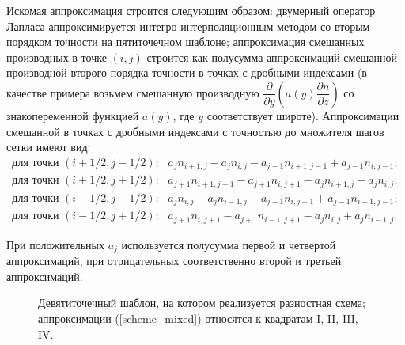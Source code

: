 \documentclass[14pt, a4paper]{extarticle}
\begin{document}
Искомая аппроксимация строится следующим образом: двумерный оператор Лапласа аппроксимируется интегро-интерполяционным методом со вторым порядком точности на пятиточечном шаблоне; аппроксимация смешанных производных в точке $(i, j)$ строится как полусумма аппроксимаций смешанной производной второго порядка точности в точках с дробными индексами (в качестве примера возьмем смешанную производную $\dfrac{\partial}{\partial y}\left(a(y)\dfrac{\partial n}{\partial z}\right)$ со знакопеременной функцией $a(y)$, где $y$ соответствует широте). Аппроксимации смешанной в точках с дробными индексами с точностью до множителя шагов сетки имеют вид:
\begin{gather}\label{scheme_mixed}
\textrm{для точки } (i+1/2, j-1/2): \mbox{ } a_j n_{i+1, j} - a_j n_{i, j} - a_{j-1} n_{i+1, j-1} + a_{j-1}n_{i, j-1};\nonumber\\
\textrm{для точки } (i+1/2, j+1/2): \mbox{ } a_{j+1} n_{i+1, j+1} - a_{j+1} n_{i, j+1} - a_{j} n_{i+1, j} + a_{j}n_{i, j};\nonumber\\
\textrm{для точки } (i-1/2, j-1/2): \mbox{ } a_j n_{i, j} - a_j n_{i-1, j} - a_{j-1} n_{i, j-1} + a_{j-1}n_{i-1, j-1};\nonumber\\
\textrm{для точки } (i-1/2, j+1/2): \mbox{ } a_{j+1} n_{i, j+1} - a_{j+1} n_{i-1, j+1} - a_{j} n_{i, j} + a_{j}n_{i-1, j}.
\end{gather}

При положительных $a_j$ используется полусумма первой и четвертой аппроксимаций, при отрицательных соответственно второй и третьей аппроксимаций.

\begin{figure}[H]

\caption{Девятиточечный шаблон, на котором реализуется разностная схема; аппроксимации (\ref{scheme_mixed}) относятся к квадратам I, II, III, IV.}
\end{figure}
\end{document}
